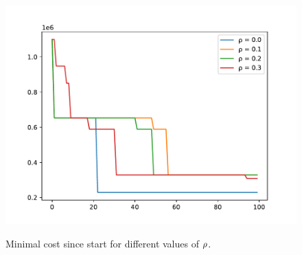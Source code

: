 \begin{figure}[h]
	\begin{centering}
		{\includegraphics[scale=0.8]{figures/experiments/rho.pdf}}
		\caption[Parameter study: $\protect \rho$]{Minimal cost since start for different values of $\protect \rho$.}
		\label{fig:rho}
	\end{centering}
\end{figure}
